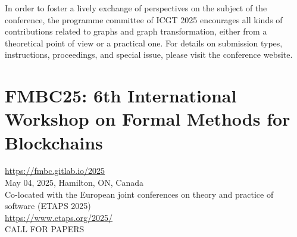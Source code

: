\documentclass[prodmode,acmtecs]{acmsmall} %
\begin{document}
\begin{itemize}
  In order to foster a lively exchange of perspectives on the subject of the conference, the programme committee of ICGT 2025 encourages all kinds of contributions related to graphs and graph transformation, either from a theoretical point of view or a practical one. For details on submission types, instructions, proceedings, and special issue, please visit the conference website.  
 
\end{itemize}\section{FMBC25: 6th International Workshop on Formal Methods for Blockchains}\label{FMBC25}  \href{https://fmbc.gitlab.io/2025}{https://fmbc.gitlab.io/2025}\\ 
  May 04, 2025, Hamilton, ON, Canada\\ 
  Co-located with the European joint conferences on theory and practice of software (ETAPS 2025)\\ 
  \href{https://www.etaps.org/2025/}{https://www.etaps.org/2025/}\\ 
CALL FOR PAPERS  
\end{document}
